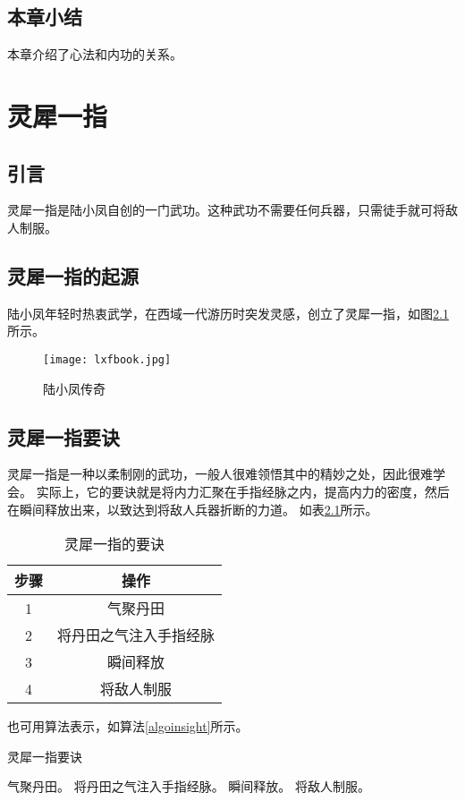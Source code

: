\documentclass[algorithmlist, figurelist,tablelist, nomlist,engineering]{seuthesix}
\begin{document}
\section{本章小结}
本章介绍了心法和内功的关系。

\chapter{灵犀一指}
\section{引言}
灵犀一指是陆小凤自创的一门武功。这种武功不需要任何兵器，只需徒手就可将敌人制服。

\section{灵犀一指的起源}
陆小凤年轻时热衷武学，在西域一代游历时突发灵感，创立了灵犀一指，如图\ref{lxfbook}所示。

\begin{figure}
\centering
\texttt{[image: lxfbook.jpg]}
\caption{陆小凤传奇\label{lxfbook}}
\end{figure}

\section{灵犀一指要诀}
灵犀一指是一种以柔制刚的武功，一般人很难领悟其中的精妙之处，因此很难学会。\cite{lxf:a}
实际上，它的要诀就是将内力汇聚在手指经脉之内，提高内力的密度，然后在瞬间释放出来，以致达到将敌人兵器折断的力道。
如表\ref{lxfinsight}所示。
\begin{table}
\centering
\caption{灵犀一指的要诀\label{lxfinsight}}
\begin{tabular}{|c||c|}
\hline
步骤 & 操作\\
\hline\hline
1 &  气聚丹田\\
\hline
2 & 将丹田之气注入手指经脉\\
\hline
3 & 瞬间释放\\
\hline
4 & 将敌人制服\\
\hline
\end{tabular}
\end{table}

也可用算法表示，如算法\ref{algoinsight}所示。

\begin{algorithm}
\caption{\label{algoinsight}灵犀一指要诀}
\begin{algorithmic}[1]
\STATE 气聚丹田。
\STATE 将丹田之气注入手指经脉。
\STATE 瞬间释放。
\STATE 将敌人制服。
\end{algorithmic}
\end{algorithm}
\end{document}
